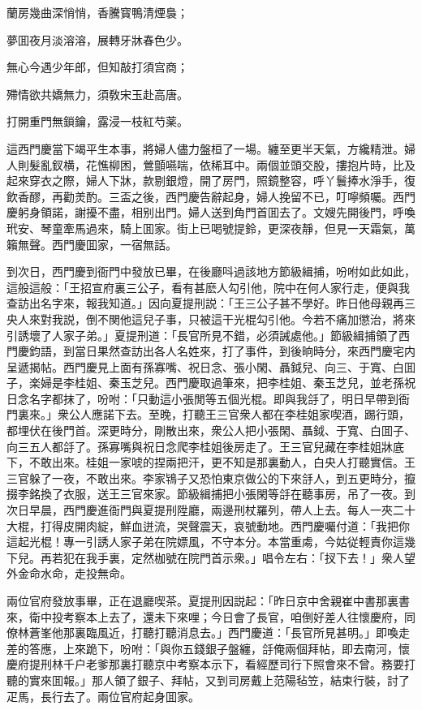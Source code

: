 蘭房幾曲深悄悄，香騰寳鴨清煙裊；

夢囬夜月淡溶溶，展轉牙牀春色少。

無心今遇少年郎，但知敲打須宫商；

殢情欲共嬌無力，須敎宋玉赴高唐。

打開重門無鎖鑰，露浸一枝紅芍薬。

這西門慶當下竭平生本事，將婦人儘力盤桓了一場。纏至更半天氣，方纔精泄。婦人則髮亂釵横，花憔柳困，鶯顫嚥喘，依稀耳中。兩個並頭交股，摟抱片時，比及起來穿衣之際，婦人下牀，款剔銀燈，開了房門，照鏡整容，呼丫鬟捧水淨手，復飲香醪，再勸羙酌。三盃之後，西門慶告辭起身，婦人挽留不已，叮嚀頻囑。西門慶躬身領諾，謝擾不盡，相别出門。婦人送到角門首囬去了。文嫂先開後門，呼喚玳安、琴童牽馬過來，騎上囬家。街上已喝號提鈴，更深夜靜，但見一天霜氣，萬籟無聲。西門慶囬家，一宿無話。

到次日，西門慶到衙門中發放已畢，在後廳呌過該地方節級緝捕，吩咐如此如此，這般這般：「王招宣府裏三公子，看有甚麽人勾引他，院中在何人家行走，便與我查訪出名字來，報我知道。」因向夏提刑説：「王三公子甚不學好。昨日他母親再三央人來對我説，倒不関他這兒子事，只被這干光棍勾引他。今若不痛加懲治，將來引誘壞了人家子弟。」夏提刑道：「長官所見不錯，必須誡處他。」節級緝捕領了西門慶鈞語，到當日果然查訪出各人名姓來，打了事件，到後晌時分，來西門慶宅内呈遞揭帖。西門慶見上面有孫寡嘴、祝日念、張小閑、聶鉞兒、向三、于寬、白囬子，楽婦是李桂姐、秦玉芝兒。西門慶取過筆來，把李桂姐、秦玉芝兒，並老孫祝日念名字都抹了，吩咐：「只動這小張閒等五個光棍。即與我㧱了，明日早帶到衙門裏來。」衆公人應諾下去。至晚，打聽王三官衆人都在李桂姐家喫酒，踢行頭，都埋伏在後門首。深更時分，剛散出來，衆公人把小張閑、聶鉞、于寬、白囬子、向三五人都㧱了。孫寡嘴與祝日念爬李桂姐後房走了。王三官兒藏在李桂姐牀底下，不敢出來。桂姐一家唬的捏兩把汗，更不知是那裏動人，白央人打聽實信。王三官躲了一夜，不敢出來。李家鴇子又恐怕東京做公的下來㧱人，到五更時分，攛掇李銘換了衣服，送王三官來家。節級緝捕把小張閑等㧱在聽事房，吊了一夜。到次日早晨，西門慶進衙門與夏提刑陞廳，兩邊刑杖羅列，帶人上去。每人一夾二十大棍，打得皮開肉綻，鮮血迸流，哭聲震天，哀號動地。西門慶囑付道：「我把你這起光棍！專一引誘人家子弟在院嫖風，不守本分。本當重䖏，今姑従輕責你這幾下兒。再若犯在我手裏，定然枷號在院門首示衆。」唱令左右：「扠下去！」衆人望外金命水命，走投無命。

兩位官府發放事畢，正在退廳喫茶。夏提刑因説起：「昨日京中舍親崔中書那裏書來，衛中投考察本上去了，還未下來哩；今日會了長官，咱倒好差人往懷慶府，同僚林蒼峯他那裏臨風近，打聽打聽消息去。」西門慶道：「長官所見甚明。」即喚走差的答應，上來跪下，吩咐：「與你五錢銀子盤纏，㧱俺兩個拜帖，即去南河，懷慶府提刑林千户老爹那裏打聽京中考察本示下，看經歷司行下照會來不曾。務要打聽的實來囬報。」那人領了銀子、拜帖，又到司房戴上范陽毡笠，結束行裝，討了疋馬，長行去了。兩位官府起身囬家。

